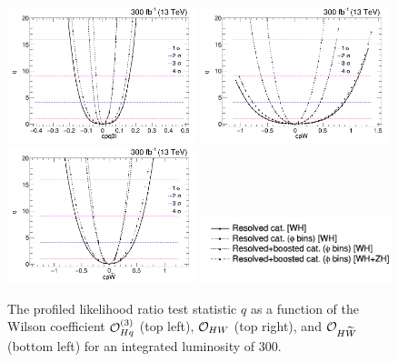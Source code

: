 \documentclass[a4paper,11pt]{article}
\begin{document}
\begin{figure}[t]
\begin{center}
\includegraphics[width=0.49\textwidth]{Figures/New/RECO/Full_NLL_WC_cpq3i_2019_opt2.png}
\includegraphics[width=0.49\textwidth]{Figures/New/RECO/Full_NLL_WC_cpW_2019_opt2.png}
\includegraphics[width=0.49\textwidth]{Figures/New/RECO/Full_NLL_WC_cpWtilde_2019_opt2.png}
\includegraphics[width=0.495\textwidth]{Figures/New/RECO/Selection_276.png}
\end{center}
\caption{
The profiled likelihood ratio test statistic $q$
as a function of the Wilson coefficient ${\cal O}^{(3)}_{Hq}$ (top left), ${\cal O}_{HW}$ (top right), and ${\cal O}_{H\widetilde{W}}$ (bottom left) for an integrated luminosity of 300\fbinv.
}
\label{fig:NLL}
\end{figure}
\end{document}
